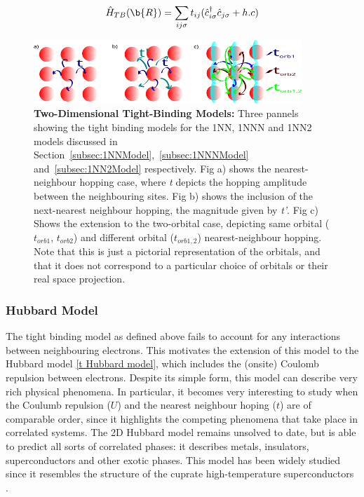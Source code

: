 \documentclass[12pt]{article}
\begin{document}
\begin{equation} \label{TBM}
    \hat{H}_{TB}(\b{R}) = \sum_{ij\sigma} t_{ij}(\hat{c}_{i\sigma}^{\dagger}\hat{c}_{j \sigma} + h.c)
\end{equation}


\begin{figure}[htbp]  %
    \centering
    \includegraphics[width=0.9\textwidth]{2Dhubbardmodel.png}  %
    \caption{\textbf{Two-Dimensional Tight-Binding Models:} Three pannels showing the tight binding models for the 1NN, 1NNN and 1NN2 models discussed in Section~\ref{subsec:1NNModel},~\ref{subsec:1NNNModel} and~\ref{subsec:1NN2Model} respectively. Fig a) shows the nearest-neighbour hopping case, where \textit{t} depicts the hopping amplitude between the neighbouring sites. Fig b) shows the inclusion of the next-nearest neighbour hopping, the magnitude given by \textit{t'}.
    Fig c) Shows the extension to the two-orbital case, depicting  same orbital ($t_{orb1}$, $t_{orb2}$) and different orbital ($t_{orb1,2}$) nearest-neighbour hopping. Note that this is just a pictorial representation of the orbitals, and that it does not correspond to a particular choice of orbitals or their real space projection. }
    \label{fig:2D Hubbard model}
\end{figure}

\newpage

\subsubsection{Hubbard Model}
\label{subsec: HubbardModel}

The  tight binding model as defined above fails to account for any interactions between neighbouring electrons. This motivates the extension of this model to the Hubbard model \eqref{t Hubbard model}, which includes the (onsite) Coulomb repulsion between electrons. Despite its simple form, this model can describe very rich physical phenomena.
In particular, it becomes very interesting to study when the Coulumb repulsion ($U$) and the nearest neighbour hoping ($t$) are of comparable order, since it highlights the competing phenomena that take place in correlated systems. 
The 2D Hubbard model remains unsolved to date, but is able to predict all sorts of correlated phases: it describes metals, insulators, superconductors and other exotic phases\cite{white1989numerical,hirsch1985two, anderson1990luttinger,sun2011nearly}. 
This model has been widely studied since it resembles the structure of the cuprate high-temperature superconductors \cite{dagotto1994correlated}. 
\end{document}

